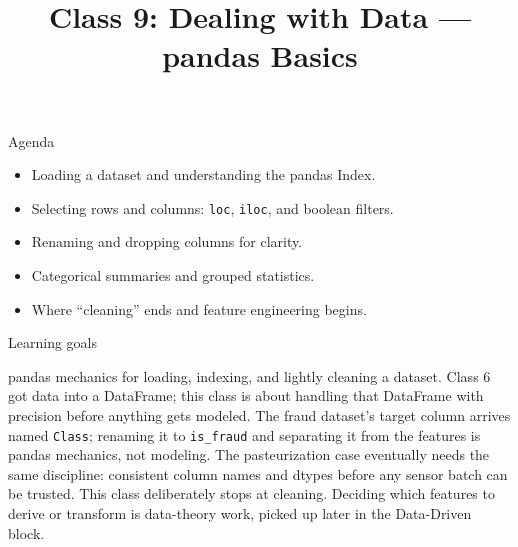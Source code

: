 

\title{Class 9: Dealing with Data --- pandas Basics}
\author{\coursename}
\date{}



\frame{\titlepage \coursefooter}

\begin{frame}{Agenda}
\begin{itemize}
\item Loading a dataset and understanding the pandas Index.
\item Selecting rows and columns: \texttt{loc}, \texttt{iloc}, and boolean filters.
\item Renaming and dropping columns for clarity.
\item Categorical summaries and grouped statistics.
\item Where ``cleaning'' ends and feature engineering begins.
\end{itemize}
\coursefooter
\end{frame}

\begin{frame}{Learning goals}
\coursefooter
\end{frame}

\coursecontextframe
{pandas mechanics for loading, indexing, and lightly cleaning a dataset.}
{Class 6 got data into a DataFrame; this class is about handling that DataFrame with precision before anything gets modeled.}
{The fraud dataset's target column arrives named \texttt{Class}; renaming it to \texttt{is\_fraud} and separating it from the features is pandas mechanics, not modeling.}
{The pasteurization case eventually needs the same discipline: consistent column names and dtypes before any sensor batch can be trusted.}
{This class deliberately stops at cleaning. Deciding which features to derive or transform is data-theory work, picked up later in the Data-Driven block.}

